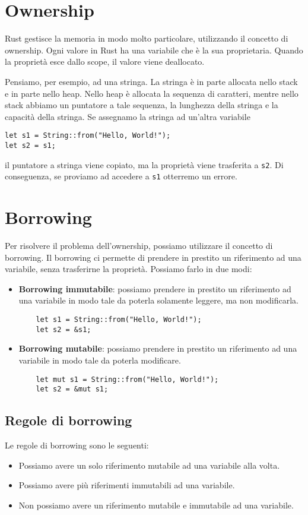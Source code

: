\documentclass[12pt]{article}
\begin{document}
\section{Ownership}
Rust gestisce la memoria in modo molto particolare, utilizzando il concetto
di ownership. Ogni valore in Rust ha una variabile che è la sua proprietaria.
Quando la proprietà esce dallo scope, il valore viene deallocato.

Pensiamo, per esempio, ad una stringa. La stringa è in parte allocata nello stack
e in parte nello heap. Nello heap è allocata la sequenza di caratteri,
mentre nello stack abbiamo un puntatore a tale sequenza, la lunghezza della stringa
e la capacità della stringa. Se assegnamo la stringa ad un'altra variabile
\begin{verbatim}
let s1 = String::from("Hello, World!");
let s2 = s1;
\end{verbatim}
il puntatore a stringa viene copiato, ma la proprietà viene trasferita a \texttt{s2}.
Di conseguenza, se proviamo ad accedere a \texttt{s1} otterremo un errore.


\section{Borrowing}
Per risolvere il problema dell'ownership, possiamo utilizzare il concetto di borrowing.
Il borrowing ci permette di prendere in prestito un riferimento ad una variabile, 
senza trasferirne la proprietà. Possiamo farlo in due modi:
\begin{itemize}
    \item \textbf{Borrowing immutabile}: possiamo prendere in prestito un riferimento
    ad una variabile in modo tale da poterla solamente leggere, ma non modificarla.
    \begin{verbatim}
    let s1 = String::from("Hello, World!");
    let s2 = &s1;
    \end{verbatim}
    \item \textbf{Borrowing mutabile}: possiamo prendere in prestito un riferimento
    ad una variabile in modo tale da poterla modificare.
    \begin{verbatim}
    let mut s1 = String::from("Hello, World!");
    let s2 = &mut s1;
    \end{verbatim}
\end{itemize}

\subsection{Regole di borrowing}
Le regole di borrowing sono le seguenti:    
\begin{itemize}
    \item Possiamo avere un solo riferimento mutabile ad una variabile alla volta.
    \item Possiamo avere più riferimenti immutabili ad una variabile.
    \item Non possiamo avere un riferimento mutabile e immutabile ad una variabile.
\end{itemize}
\end{document}
